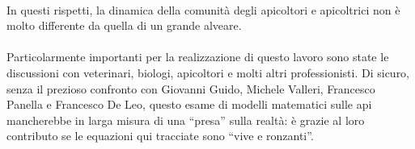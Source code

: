 \paragraph{}
In questi rispetti, la dinamica della comunità degli apicoltori e apicoltrici non è molto differente da
quella di un grande alveare.

\paragraph{}
Particolarmente importanti per la realizzazione di questo lavoro sono state le discussioni con veterinari, biologi,
apicoltori e molti altri professionisti.
Di sicuro, senza il prezioso confronto con Giovanni Guido, Michele Valleri, Francesco Panella
e Francesco De Leo, questo esame di modelli matematici sulle api mancherebbe in larga misura di una ``presa'' sulla realtà:
è grazie al loro contributo se le equazioni qui tracciate sono ``vive e ronzanti''.



